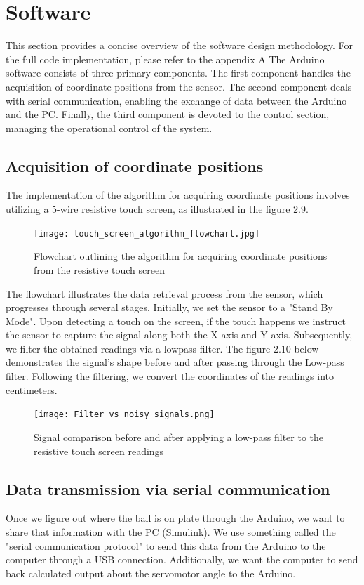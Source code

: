 \section{Software}
This section provides a concise overview of the software design methodology. For the full code implementation, please refer to the appendix A
The Arduino software consists of three primary components. The first component handles the acquisition of coordinate positions from the sensor. The second component deals with serial communication, enabling the exchange of data between the Arduino and the PC. Finally, the third component is devoted to the control section, managing the operational control of the system.


\subsection{Acquisition of coordinate positions}
The implementation of the algorithm for acquiring coordinate positions involves utilizing a 5-wire resistive touch screen, as illustrated in the figure 2.9.
\begin{figure}[h]
    \centering
    \texttt{[image: touch\_screen\_algorithm\_flowchart.jpg]}
    \caption{Flowchart outlining the algorithm for acquiring coordinate positions from the resistive touch screen}
    \label{fig:enter-label}
\end{figure}
The flowchart illustrates the data retrieval process from the sensor, which progresses through several stages. Initially, we set the sensor to a "Stand By Mode". Upon detecting a touch on the screen, if the touch happens we instruct the sensor to capture the signal along both the X-axis and Y-axis. Subsequently, we filter the obtained readings via a lowpass filter. The figure 2.10 below demonstrates the signal's shape before and after passing through the Low-pass filter. Following the filtering, we convert the coordinates of the readings into centimeters.

\begin{figure}[h!]
    \centering
    \texttt{[image: Filter\_vs\_noisy\_signals.png]}
    \caption{Signal comparison before and after applying a low-pass filter to the resistive touch screen readings}
    \label{fig:enter-label}
\end{figure}

\subsection{Data transmission via serial communication}
Once we figure out where the ball is on plate through the Arduino, we want to share that information with the PC (Simulink). We use something called the "serial communication protocol" to send this data from the Arduino to the computer through a USB connection. Additionally, we want the computer to send back calculated output about the servomotor angle to the Arduino.

